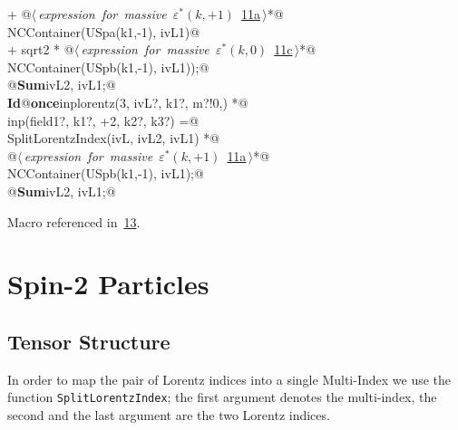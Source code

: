 \documentclass[a4paper,12pt]{amsart}
\renewcommand{\NWlink}[2]{\hyperlink{#1}{#2}}
\renewcommand{\NWtxtMacroRefIn}{Macro referenced in}
\renewcommand{\NWsep}{${\diamond}$}
\begin{document}
\begin{flushleft}
\begin{minipage}{\linewidth}
\begin{list}{}{}
\mbox{}\verb@   + @\hbox{$\langle\,${\itshape expression for massive $\varepsilon^\ast(k, +1)$}\nobreak\ {\footnotesize \NWlink{nuweb11a}{11a}}$\,\rangle$}\verb@ *@\\
\mbox{}\verb@     NCContainer(USpa(k1,-1), ivL1)@\\
\mbox{}\verb@   + sqrt2 * @\hbox{$\langle\,${\itshape expression for massive $\varepsilon^\ast(k, 0)$}\nobreak\ {\footnotesize \NWlink{nuweb11c}{11c}}$\,\rangle$}\verb@ *@\\
\mbox{}\verb@     NCContainer(USpb(k1,-1), ivL1));@\\
\mbox{}\verb@   @\hbox{\sffamily\bfseries Sum}\verb@ ivL2, ivL1;@\\
\mbox{}\verb@@\hbox{\sffamily\bfseries Id}\verb@ @\hbox{\sffamily\bfseries once}\verb@ inplorentz(3, ivL?, k1?, m?!{0,}) *@\\
\mbox{}\verb@      inp(field1?, k1?, +2, k2?, k3?) =@\\
\mbox{}\verb@   SplitLorentzIndex(ivL, ivL2, ivL1) *@\\
\mbox{}\verb@   @\hbox{$\langle\,${\itshape expression for massive $\varepsilon^\ast(k, +1)$}\nobreak\ {\footnotesize \NWlink{nuweb11a}{11a}}$\,\rangle$}\verb@ *@\\
\mbox{}\verb@   NCContainer(USpb(k1,-1), ivL1);@\\
\mbox{}\verb@   @\hbox{\sffamily\bfseries Sum}\verb@ ivL2, ivL1;@\\
\mbox{}\verb@@{\NWsep}
\end{list}
\vspace{-1.5ex}
\footnotesize
\begin{list}{}{\setlength{\itemsep}{-\parsep}\setlength{\itemindent}{-\leftmargin}}
\item \NWtxtMacroRefIn\ \NWlink{nuweb13}{13}.

\item{}
\end{list}
\end{minipage}\vspace{4ex}
\end{flushleft}

\section{Spin-2 Particles}
\subsection{Tensor Structure}
In order to map the pair of Lorentz indices into a single Multi-Index
we use the function \texttt{SplitLorentzIndex}; the first argument denotes
the multi-index, the second and the last argument are the two Lorentz indices.
\end{document}
